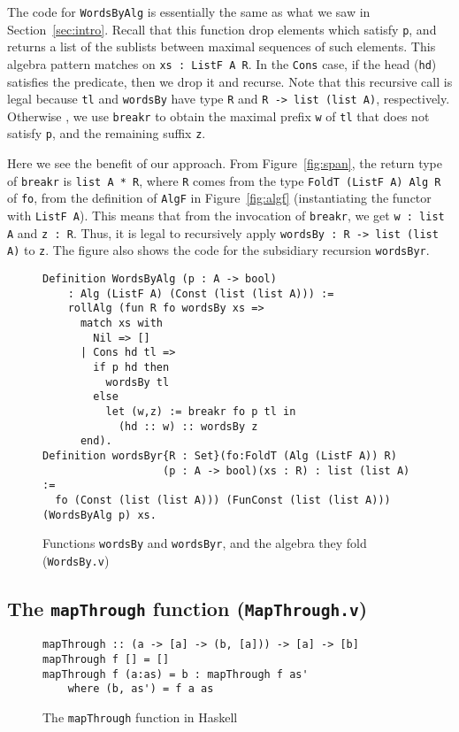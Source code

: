 \documentclass[a4paper,USenglish]{lipics-v2021}
\begin{document}
The code for \verb|WordsByAlg| is essentially the same as what we saw
in Section~\ref{sec:intro}.  Recall that this function drop elements
which satisfy \verb|p|, and returns a list of the sublists between
maximal sequences of such elements. This algebra pattern matches on
\verb|xs : ListF A R|. In the \verb|Cons| case, if the head
(\verb|hd|) satisfies the predicate, then we drop it and recurse.
Note that this recursive call is legal because \verb|tl| and
\verb|wordsBy| have type \verb|R| and \verb|R -> list (list A)|,
respectively. Otherwise , we use \verb|breakr| to obtain the maximal
prefix \verb|w| of \verb|tl| that does not satisfy \verb|p|, and the
remaining suffix \verb|z|.

Here we see the benefit of our approach.  From Figure~\ref{fig:span},
the return type of \verb|breakr| is \verb|list A * R|, where \verb|R|
comes from the type \verb|FoldT (ListF A) Alg R| of
\verb|fo|, from the definition
of \verb|AlgF| in Figure~\ref{fig:algf} (instantiating the functor
with \verb|ListF A|).  This means that from the invocation of
\verb|breakr|, we get \verb|w : list A| and \verb|z : R|.  Thus, it is
legal to recursively apply \verb|wordsBy : R -> list (list A)| to
\verb|z|. The figure also shows the code for the subsidiary
recursion \verb|wordsByr|.

\begin{figure}
\begin{verbatim}
Definition WordsByAlg (p : A -> bool)
    : Alg (ListF A) (Const (list (list A))) :=
    rollAlg (fun R fo wordsBy xs =>
      match xs with
        Nil => []
      | Cons hd tl =>
        if p hd then
          wordsBy tl
        else
          let (w,z) := breakr fo p tl in
            (hd :: w) :: wordsBy z
      end).
Definition wordsByr{R : Set}(fo:FoldT (Alg (ListF A)) R)
                   (p : A -> bool)(xs : R) : list (list A) :=
  fo (Const (list (list A))) (FunConst (list (list A))) (WordsByAlg p) xs.
\end{verbatim}
\caption{Functions  \texttt{wordsBy} and \texttt{wordsByr}, and the algebra they
  fold (\texttt{WordsBy.v})}
\label{fig:wordsby}
\end{figure}

\subsection{The \texttt{mapThrough} function (\texttt{MapThrough.v})}

\begin{figure}
\begin{verbatim}
mapThrough :: (a -> [a] -> (b, [a])) -> [a] -> [b]
mapThrough f [] = []
mapThrough f (a:as) = b : mapThrough f as'
    where (b, as') = f a as
\end{verbatim}
\caption{The \texttt{mapThrough} function in Haskell}
\label{fig:mapthroughhs}
\end{figure}
\end{document}
